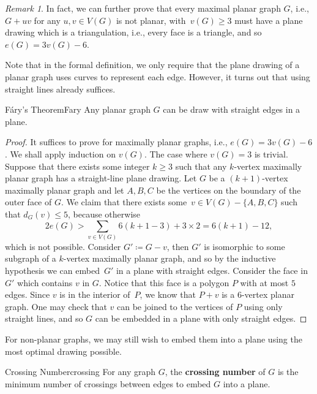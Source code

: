 \documentclass[math]{amznotes}
\theoremstyle{remark}
\newtheorem*{remark}{Remark}
\newcommand{\0}{\mathbf{0}}
\newcommand{\1}{\mathbf{1}}
\begin{document}
\begin{notebox}
    \begin{remark}
        In fact, we can further prove that every maximal planar graph $G$, i.e., $G + uv$ for any $u, v \in V(G)$ is not planar,  with~$v(G) \geq 3$ must have a plane drawing which is a triangulation, i.e., every face is a triangle, and so~$e(G) = 3v(G) - 6$.
    \end{remark}
\end{notebox}
Note that in the formal definition, we only require that the plane drawing of a planar graph uses curves to represent each edge. However, it turns out that using straight lines already suffices.
\begin{thmbox}{F\'{a}ry's Theorem}{Fary}
    Any planar graph $G$ can be draw with straight edges in a plane.
    \tcblower
    \begin{proof}
        It suffices to prove for maximally planar graphs, i.e., $e(G) = 3v(G) - 6$. We shall apply induction on $v(G)$. The case where $v(G) = 3$ is trivial. Suppose that there exists some integer $k \geq 3$ such that any $k$-vertex maximally planar graph has a straight-line plane drawing. Let $G$ be a $(k + 1)$-vertex maximally planar graph and let $A, B, C$ be the vertices on the boundary of the outer face of $G$. We claim that there exists some~$v \in V(G) - \{A, B, C\}$ such that $d_G(v) \leq 5$, because otherwise 
        \begin{equation*}
            2e(G) > \sum_{v \in V(G)}6(k + 1 - 3) + 3 \times 2 = 6(k + 1) - 12,
        \end{equation*}
        which is not possible. Consider $G' \coloneqq G - v$, then $G'$ is isomorphic to some subgraph of a $k$-vertex maximally planar graph, and so by the inductive hypothesis we can embed~$G'$ in a plane with straight edges. Consider the face in $G'$ which contains $v$ in $G$. Notice that this face is a polygon $P$ with at most $5$ edges. Since $v$ is in the interior of~$P$, we know that $P + v$ is a $6$-vertex planar graph. One may check that $v$ can be joined to the vertices of $P$ using only straight lines, and so $G$ can be embedded in a plane with only straight edges.
    \end{proof}
\end{thmbox}
For non-planar graphs, we may still wish to embed them into a plane using the most optimal drawing possible.
\begin{dfnbox}{Crossing Number}{crossing}
    For any graph $G$, the {\color{red} \textbf{crossing number}} of $G$ is the minimum number of crossings between edges to embed $G$ into a plane.
\end{dfnbox}
\end{document}
